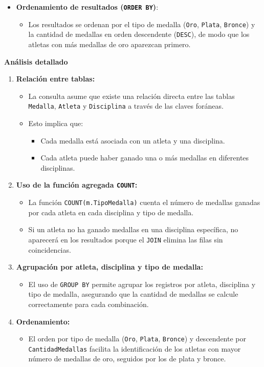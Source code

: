 \begin{itemize}
   \item \textbf{Ordenamiento de resultados (\texttt{ORDER BY})}:
   \begin{itemize}
       \item Los resultados se ordenan por el tipo de medalla (\texttt{Oro}, \texttt{Plata}, \texttt{Bronce}) y la cantidad de medallas en orden descendente (\texttt{DESC}), de modo que los atletas con más medallas de oro aparezcan primero.
   \end{itemize}
\end{itemize}

\textbf{Análisis detallado}

\begin{enumerate}
   \item \textbf{Relación entre tablas:}
   \begin{itemize}
       \item La consulta asume que existe una relación directa entre las tablas \texttt{Medalla}, \texttt{Atleta} y \texttt{Disciplina} a través de las claves foráneas.
       \item Esto implica que:
       \begin{itemize}
           \item Cada medalla está asociada con un atleta y una disciplina.
           \item Cada atleta puede haber ganado una o más medallas en diferentes disciplinas.
       \end{itemize}
   \end{itemize}
   
   \item \textbf{Uso de la función agregada \texttt{COUNT}:}
   \begin{itemize}
       \item La función \texttt{COUNT(m.TipoMedalla)} cuenta el número de medallas ganadas por cada atleta en cada disciplina y tipo de medalla.
       \item Si un atleta no ha ganado medallas en una disciplina específica, no aparecerá en los resultados porque el \texttt{JOIN} elimina las filas sin coincidencias.
   \end{itemize}
   
   \item \textbf{Agrupación por atleta, disciplina y tipo de medalla:}
   \begin{itemize}
       \item El uso de \texttt{GROUP BY} permite agrupar los registros por atleta, disciplina y tipo de medalla, asegurando que la cantidad de medallas se calcule correctamente para cada combinación.
   \end{itemize}
   
   \item \textbf{Ordenamiento:}
   \begin{itemize}
       \item El orden por tipo de medalla (\texttt{Oro}, \texttt{Plata}, \texttt{Bronce}) y descendente por \texttt{CantidadMedallas} facilita la identificación de los atletas con mayor número de medallas de oro, seguidos por los de plata y bronce.
   \end{itemize}
\end{enumerate}

